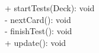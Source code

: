 { 
    + startTests(Deck): void \\
    - nextCard(): void \\
    - finishTest(): void \\
    + update(): void \\
}{}